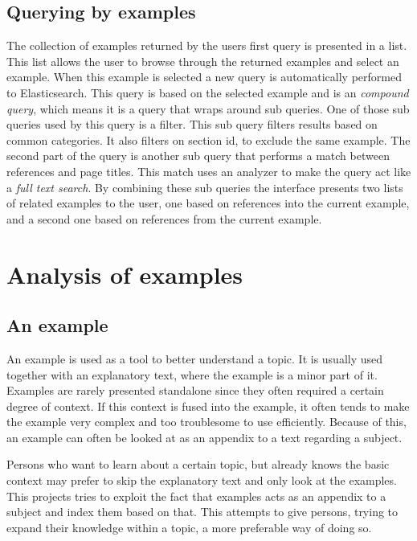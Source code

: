 \subsection{Querying by examples}
The collection of examples returned by the users first query is presented in a list. This list allows the user to browse through the returned examples and select an example. When this example is selected a new query is automatically performed to Elasticsearch. This query is based on the selected example and is an \textit{compound query}, which means it is a query that wraps around sub queries. One of those sub queries used by this query is a filter. This sub query filters results based on common categories. It also filters on section id, to exclude the same example. The second part of the query is another sub query that performs a match between references and page titles. This match uses an analyzer to make the query act like a \textit{full text search}. %
By combining these sub queries the interface presents two lists of related examples to the user, one based on references into the current example, and a second one based on references from the current example. 

\section{Analysis of examples} \label{examples-section} %

\subsection{An example}

An example is used as a tool to better understand a topic. It is usually used together with an explanatory text, where the example is a minor part of it. Examples are rarely presented standalone since they often required a certain degree of context. If this context is fused into the example, it often tends to make the example very complex and too troublesome to use efficiently. Because of this, an example can often be looked at as an appendix to a text regarding a subject. 


Persons who want to learn about a certain topic, but already knows the basic context may prefer to skip the explanatory text and only look at the examples. This projects tries to exploit the fact that examples acts as an appendix to a subject and index them based on that. This attempts to give persons, trying to expand their knowledge within a topic, a more preferable way of doing so.

